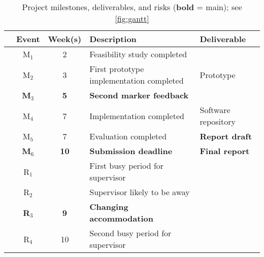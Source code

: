 \documentclass[11pt]{ipp}
\begin{document}
{\begin{landscape}
    \begin{table*}[!p]%
      \begin{center}
          \begin{tabular}{lcS[table-format=2.0]*{2}{l}}
          \toprule
          & \textbf{Event} & \textbf{Week(s)} & \textbf{Description} & \textbf{Deliverable}\\
          \midrule
          & \textcolor{milestoneColor}{M$_1$} &
              2 & Feasibility study completed\\
          & \textcolor{milestoneColor}{M$_2$} &
              3 & First prototype implementation completed
              & Prototype\\
          & \bfseries\textcolor{milestoneColor}{M$_3$} &
              \bfseries 5 & \bfseries Second marker feedback\\
          & \textcolor{milestoneColor}{M$_4$} &
              7 & Implementation completed
              & Software repository\\
          & \textcolor{milestoneColor}{M$_5$} &
              7 & Evaluation completed
              & \bfseries Report draft\\
          & \textbf{\textcolor{milestoneColor}{M$_6$}} &
              \bfseries 10 & \bfseries Submission deadline
              & \bfseries Final report\\
          \midrule
          & \textcolor{riskColor}{R$_1$} & 
               & First busy period for supervisor\\
          & \textcolor{riskColor}{R$_2$} &  &
              Supervisor likely to be away\\
          & \bfseries\textcolor{riskColor}{R$_3$} & \bfseries 9 &
              \bfseries Changing accommodation\\
          & \textcolor{riskColor}{R$_4$} &  10 & Second busy period for supervisor\\
          \bottomrule
          \end{tabular} 
      \end{center}
      \caption[Project milestones, deliverables and risks]{Project milestones, deliverables, and risks (\textbf{bold} = main); see \cref{fig:gantt}}
      \label{tab:MDR}
    \end{table*}
  \end{landscape}
}%
\end{document}
